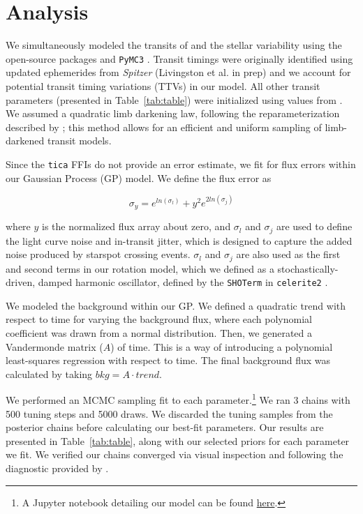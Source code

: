 \documentclass[linenumbers,modern,twocolumn]{aastex631}
\begin{document}
\section{Analysis} \label{sec:analysis}

We simultaneously modeled the transits of \allplanets and the stellar variability using the open-source packages \exoplanet \citep{exoplanet2019, exoplanet2021} and \texttt{PyMC3} \citep{Salvatier16}. Transit timings were originally identified using updated ephemerides from \textit{Spitzer} (Livingston et al. in prep) and we account for potential transit timing variations (TTVs) in our model. All other transit parameters (presented in Table~\ref{tab:table}) were initialized using values from \cite{David2019a}. We assumed a quadratic limb darkening law, following the reparameterization described by \cite{kipping13}; this method allows for an efficient and uniform sampling of limb-darkened transit models.


Since the \texttt{tica} FFIs do not provide an error estimate, we fit for flux errors within our Gaussian Process (GP) model. We define the flux error as

\begin{equation}
    \sigma_y = e^{ln(\sigma_l)} + y^2 e^{2 ln(\sigma_j)}
\end{equation}

where $y$ is the normalized flux array about zero, and $\sigma_l$  and $\sigma_j$ are used to define the light curve noise and in-transit jitter, which is designed to capture the added noise produced by starspot crossing events. $\sigma_l$  and $\sigma_j$ are also used as the first and second terms in our rotation model, which we defined as a stochastically-driven, damped harmonic oscillator, defined by the \texttt{SHOTerm} in \texttt{celerite2} \citep{dfm17}.

We modeled the background within our GP. We defined a quadratic trend with respect to time for varying the background flux, where each polynomial coefficient was drawn from a normal distribution. Then, we generated a Vandermonde matrix ($A$) of time. This is a way of introducing a polynomial least-squares regression with respect to time. The final background flux was calculated by taking $bkg = A \cdot trend$.  

We performed an MCMC sampling fit to each parameter.\footnote{A Jupyter notebook detailing our model can be found \href{https://github.com/afeinstein20/v1298tau\_tess/blob/main/notebooks/TESS\_V1298Tau.ipynb}{here}.} We ran 3 chains with 500 tuning steps and 5000 draws. We discarded the tuning samples from the posterior chains before calculating our best-fit parameters. Our results are presented in Table~\ref{tab:table}, along with our selected priors for each parameter we fit. We verified our chains converged via visual inspection and following the diagnostic provided by \cite{Geweke92}.
\end{document}

